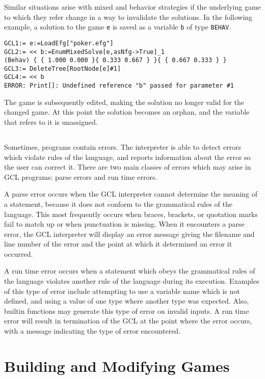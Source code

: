 Similar situations arise with mixed and behavior strategies if the
underlying game to which they refer change in a way to invalidate the
solutions.  In the following example, a solution to the game \verb+e+
is saved as a variable \verb+b+ of type \verb+BEHAV+.  

\begin{verbatim}
GCL1:= e:=LoadEfg["poker.efg"]
GCL2:= << b:=EnumMixedSolve[e,asNfg->True]_1
(Behav) { { 1.000 0.000 }{ 0.333 0.667 } }{ { 0.667 0.333 } }
GCL3:= DeleteTree[RootNode[e]#1]
GCL4:= << b
ERROR: Print[]: Undefined reference "b" passed for parameter #1
\end{verbatim}

The game is subsequently edited, making the solution no longer valid
for the changed game.  At this point the solution becomes an orphan,
and the variable that refers to it is unassigned.  

\section{}

Sometimes, programs contain errors.  The interpreter is able to detect
errors which violate rules of the language, and reports information
about the error so the user can correct it.  There are two main
classes of errors which may arise in GCL programs: parse errors and
run time errors.

A parse error occurs when the GCL interpreter cannot determine the
meaning of a statement, because it does not conform to the grammatical
rules of the language.  This most frequently occurs when braces,
brackets, or quotation marks fail to match up or when punctuation is
missing.  When it encounters a parse error, the GCL interpreter will
display an error message giving the filename and line number of the
error and the point at which it determined an error it occurred.

A run time error occurs when a statement which obeys the grammatical
rules of the language violates another rule of the language during its
execution.  Examples of this type of error include attempting to use a
variable name which is not defined, and using a value of one type
where another type was expected.  Also, builtin functions may generate
this type of error on invalid inputs.  A run time error will result in
termination of the GCL at the point where the error occurs, with a
message indicating the type of error encountered.

\chapter{Building and Modifying Games}

